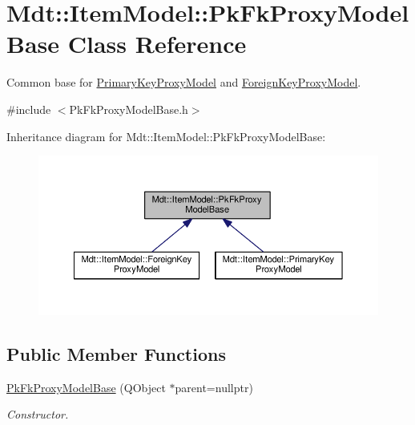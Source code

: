 \hypertarget{class_mdt_1_1_item_model_1_1_pk_fk_proxy_model_base}{}\section{Mdt\+:\+:Item\+Model\+:\+:Pk\+Fk\+Proxy\+Model\+Base Class Reference}
\label{class_mdt_1_1_item_model_1_1_pk_fk_proxy_model_base}


Common base for \hyperlink{class_mdt_1_1_item_model_1_1_primary_key_proxy_model}{Primary\+Key\+Proxy\+Model} and \hyperlink{class_mdt_1_1_item_model_1_1_foreign_key_proxy_model}{Foreign\+Key\+Proxy\+Model}.  




{\ttfamily \#include $<$Pk\+Fk\+Proxy\+Model\+Base.\+h$>$}



Inheritance diagram for Mdt\+:\+:Item\+Model\+:\+:Pk\+Fk\+Proxy\+Model\+Base\+:\nopagebreak
\begin{figure}[H]
\begin{center}
\leavevmode
\includegraphics[width=350pt]{class_mdt_1_1_item_model_1_1_pk_fk_proxy_model_base__inherit__graph}
\end{center}
\end{figure}
\subsection*{Public Member Functions}
\begin{DoxyCompactItemize}
\item 
\hyperlink{class_mdt_1_1_item_model_1_1_pk_fk_proxy_model_base_adb72f773a5efaa240e3916bbb4613fec}{Pk\+Fk\+Proxy\+Model\+Base} (Q\+Object $\ast$parent=nullptr)\hypertarget{class_mdt_1_1_item_model_1_1_pk_fk_proxy_model_base_adb72f773a5efaa240e3916bbb4613fec}{}\label{class_mdt_1_1_item_model_1_1_pk_fk_proxy_model_base_adb72f773a5efaa240e3916bbb4613fec}

\begin{DoxyCompactList}\small\item\em Constructor. \end{DoxyCompactList}\end{DoxyCompactItemize}
